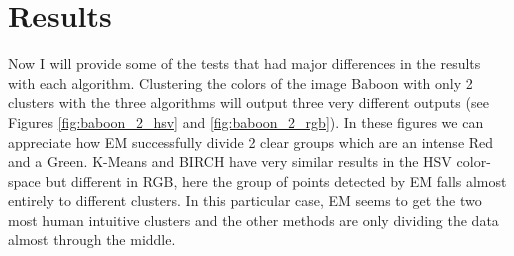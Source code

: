 \documentclass[sigconf,authorversion]{acmart}
\begin{document}
\section{Results}
Now I will provide some of the tests that had major differences in the results with each algorithm.
Clustering the colors of the image Baboon with only 2 clusters with the three algorithms will output three very different outputs (see Figures \ref{fig:baboon_2_hsv} and \ref{fig:baboon_2_rgb}). In these figures we can appreciate how EM successfully divide 2 clear groups which are an intense Red and a Green. K-Means and BIRCH have very similar results in the HSV color-space but different in RGB, here the group of points detected by EM falls almost entirely to different clusters. In this particular case, EM seems to get the two most human intuitive clusters and the other methods are only dividing the data almost through the middle.
\end{document}
